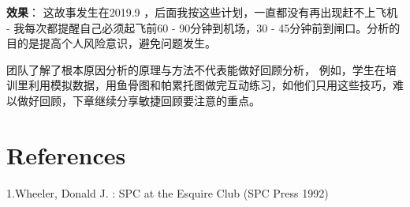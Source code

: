 \textbf{效果}： 这故事发生在2019.9
，后面我按这些计划，一直都没有再出现赶不上飞机 -
我每次都提醒自己必须起飞前60 - 90分钟到机场，30 -
45分钟前到闸口。分析的目的是提高个人风险意识，避免问题发生。

团队了解了根本原因分析的原理与方法不代表能做好回顾分析，
例如，学生在培训里利用模拟数据，用鱼骨图和帕累托图做完互动练习，如他们只用这些技巧，难以做好回顾，下章继续分享敏捷回顾要注意的重点。

\hypertarget{references}{%
\section{References}\label{references}}

1.Wheeler, Donald J. : SPC at the Esquire Club (SPC Press 1992)\\
